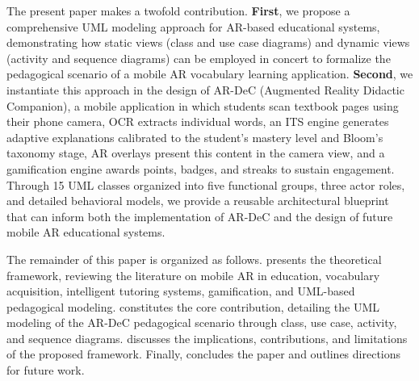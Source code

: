 The present paper makes a twofold contribution. \textbf{First}, we propose a comprehensive UML modeling approach for AR-based educational systems, demonstrating how static views (class and use case diagrams) and dynamic views (activity and sequence diagrams) can be employed in concert to formalize the pedagogical scenario of a mobile AR vocabulary learning application. \textbf{Second}, we instantiate this approach in the design of AR-DeC (Augmented Reality Didactic Companion), a mobile application in which students scan textbook pages using their phone camera, OCR extracts individual words, an ITS engine generates adaptive explanations calibrated to the student's mastery level and Bloom's taxonomy stage, AR overlays present this content in the camera view, and a gamification engine awards points, badges, and streaks to sustain engagement. Through 15 UML classes organized into five functional groups, three actor roles, and detailed behavioral models, we provide a reusable architectural blueprint that can inform both the implementation of AR-DeC and the design of future mobile AR educational systems.

The remainder of this paper is organized as follows.  presents the theoretical framework, reviewing the literature on mobile AR in education, vocabulary acquisition, intelligent tutoring systems, gamification, and UML-based pedagogical modeling.  constitutes the core contribution, detailing the UML modeling of the AR-DeC pedagogical scenario through class, use case, activity, and sequence diagrams.  discusses the implications, contributions, and limitations of the proposed framework. Finally,  concludes the paper and outlines directions for future work.
